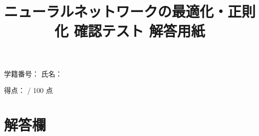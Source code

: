 \documentclass[uplatex,a4paper,12pt]{jsarticle}
\begin{document}
\title{ニューラルネットワークの最適化・正則化 確認テスト 解答用紙}
\author{}
\date{}
\maketitle

\noindent
学籍番号：\underline{\hspace{5cm}} \hfill
氏名：\underline{\hspace{5cm}}

\vspace{5mm}

\noindent
得点：\underline{\hspace{3cm}} / 100 点

\vspace{8mm}

\section*{解答欄}
\end{document}
